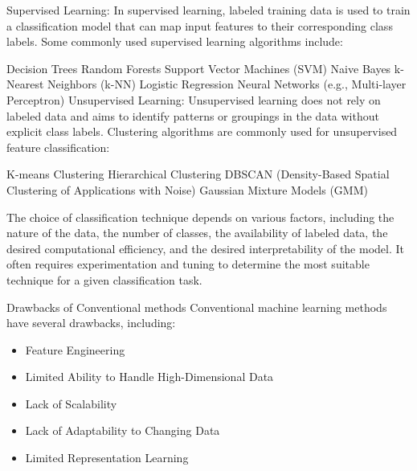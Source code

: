 \documentclass[10pt,aspectratio=169,dvipsnames]{beamer} %
\begin{document}
{		Supervised Learning: In supervised learning, labeled training data is used to train a classification model that can map input features to their corresponding class labels. Some commonly used supervised learning algorithms include:
		
		Decision Trees
		Random Forests
		Support Vector Machines (SVM)
		Naive Bayes
		k-Nearest Neighbors (k-NN)
		Logistic Regression
		Neural Networks (e.g., Multi-layer Perceptron)
		Unsupervised Learning: Unsupervised learning does not rely on labeled data and aims to identify patterns or groupings in the data without explicit class labels. Clustering algorithms are commonly used for unsupervised feature classification:
		
		K-means Clustering
		Hierarchical Clustering
		DBSCAN (Density-Based Spatial Clustering of Applications with Noise)
		Gaussian Mixture Models (GMM)
		
		The choice of classification technique depends on various factors, including the nature of the data, the number of classes, the availability of labeled data, the desired computational efficiency, and the desired interpretability of the model. It often requires experimentation and tuning to determine the most suitable technique for a given classification task.
	}
	\begin{frame}{Drawbacks of Conventional methods}
		Conventional machine learning methods have several drawbacks, including:
		\begin{itemize}
			\item Feature Engineering
			\item Limited Ability to Handle High-Dimensional Data
			\item Lack of Scalability
			\item Lack of Adaptability to Changing Data
			\item Limited Representation Learning
		\end{itemize}
	\end{frame}
\end{document}
